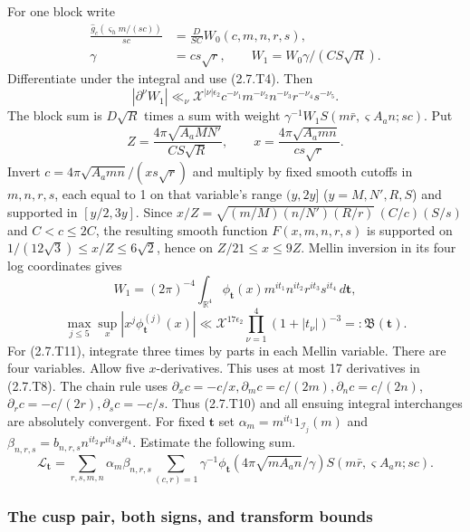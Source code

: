 For one block write
\[
\begin{aligned}
\frac{\widehat g_c(\varsigma_hm/(sc))}{sc}
 &=\frac D{SC}W_0(c,m,n,r,s),\\
\gamma&=cs\sqrt r,\qquad W_1=W_0\gamma/(CS\sqrt R).
\end{aligned}
\tag{2.7.T7}\label{p1:eq:2.7.T7}
\]
Differentiate under the integral and use (2.7.T4). Then
\[
|\partial^\nu W_1|
 \ll_\nu\mathcal X^{|\nu|\epsilon_2}
            c^{-\nu_1}m^{-\nu_2}n^{-\nu_3}r^{-\nu_4}s^{-\nu_5}.
\tag{2.7.T8}\label{p1:eq:2.7.T8}
\]
The block sum is $D\sqrt R$ times a sum with weight
$\gamma^{-1}W_1S(m\bar r,\varsigma A_an;sc)$.
Put
\[
Z=\frac{4\pi\sqrt{A_aMN'}}{CS\sqrt R},
\qquad x=\frac{4\pi\sqrt{A_amn}}{cs\sqrt r}.
\tag{2.7.T9}\label{p1:eq:2.7.T9}
\]
Invert $c=4\pi\sqrt{A_amn}/(xs\sqrt r)$ and multiply by fixed smooth
cutoffs in $m,n,r,s$, each equal to 1 on that variable's range
$(y,2y]$ ($y=M,N',R,S$) and supported in $[y/2,3y]$. Since
$x/Z=\sqrt{(m/M)(n/N')(R/r)}\,(C/c)(S/s)$ and $C<c\le2C$, the
resulting smooth function $F(x,m,n,r,s)$ is supported on
$1/(12\sqrt3)\le x/Z\le6\sqrt2$, hence on $Z/21\le x\le9Z$.
Mellin inversion in its four log coordinates gives
\[
W_1=(2\pi)^{-4}\int_{\mathbb R^4}\phi_{\mathbf t}(x)
 m^{it_1}n^{it_2}r^{it_3}s^{it_4}\,d\mathbf t,
\tag{2.7.T10}\label{p1:eq:2.7.T10}
\]
\[
\max_{j\le5}\sup_x|x^j\phi_{\mathbf t}^{(j)}(x)|
 \ll\mathcal X^{17\epsilon_2}
                  \prod_{\nu=1}^4(1+|t_\nu|)^{-3}
 =:\mathfrak B(\mathbf t).
\tag{2.7.T11}\label{p1:eq:2.7.T11}
\]
For (2.7.T11), integrate three times by parts in each Mellin variable. There are four variables. Allow five $x$-derivatives. This uses at most 17 derivatives in (2.7.T8). The chain rule uses
$\partial_xc=-c/x,\partial_mc=c/(2m),\partial_nc=c/(2n)$,
$\partial_rc=-c/(2r),\partial_sc=-c/s$.
Thus (2.7.T10) and all ensuing integral interchanges are absolutely
convergent. For fixed $\mathbf t$ set
$\alpha_m=m^{it_1}1_{\mathcal I_j}(m)$ and
$\beta_{n,r,s}=b_{n,r,s}n^{it_2}r^{it_3}s^{it_4}$.
Estimate the following sum.
\[
\mathcal L_{\mathbf t}
 =\sum_{r,s,m,n}\alpha_m\beta_{n,r,s}
  \sum_{(c,r)=1}\gamma^{-1}\phi_{\mathbf t}
       (4\pi\sqrt{mA_an}/\gamma)S(m\bar r,\varsigma A_an;sc).
\tag{2.7.T12}\label{p1:eq:2.7.T12}
\]

\subsubsection{The cusp pair, both signs, and transform bounds}\label{p1:sec:t-cusp-pair}

